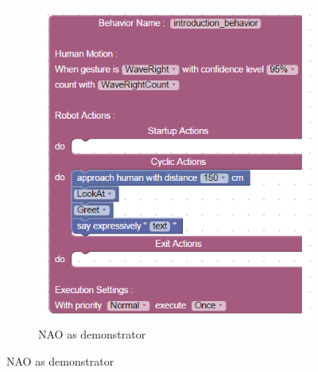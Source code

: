 \documentclass{llncs}
\begin{document}
\begin{figure}
\centering
\begin{subfigure}[t]{0.5\textwidth}
\includegraphics[width=\textwidth]{../thesis/assets/scenario1.png}
\caption[NAO as demonstrator]{NAO as demonstrator}
\label{fig:scenario1_program}
\end{subfigure}


\end{figure}
\end{document}
